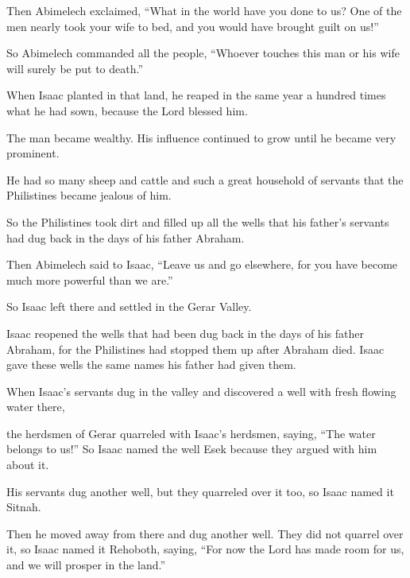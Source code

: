 \begin{scripture}
 Then Abimelech exclaimed, ``What in the world have you done to us? One of the men nearly took your wife to bed, and you would have brought guilt on us!''
 So Abimelech commanded all the people, ``Whoever touches this man or his wife will surely be put to death.''
\everypar{}

 When Isaac planted in that land, he reaped in the same year a hundred times what he had sown, because the Lord blessed him.
 The man became wealthy. His influence continued to grow until he became very prominent.
 He had so many sheep and cattle and such a great household of servants that the Philistines became jealous of him.
 So the Philistines took dirt and filled up all the wells that his father's servants had dug back in the days of his father Abraham.
\everypar{}

 Then Abimelech said to Isaac, ``Leave us and go elsewhere, for you have become much more powerful than we are.''
 So Isaac left there and settled in the Gerar Valley.
 Isaac reopened the wells that had been dug back in the days of his father Abraham, for the Philistines had stopped them up after Abraham died. Isaac gave these wells the same names his father had given them.
\everypar{}

 When Isaac's servants dug in the valley and discovered a well with fresh flowing water there,
 the herdsmen of Gerar quarreled with Isaac's herdsmen, saying, ``The water belongs to us!'' So Isaac named the well Esek because they argued with him about it.
 His servants dug another well, but they quarreled over it too, so Isaac named it Sitnah.
 Then he moved away from there and dug another well. They did not quarrel over it, so Isaac named it Rehoboth, saying, ``For now the Lord has made room for us, and we will prosper in the land.''
\everypar{}


\end{scripture}
